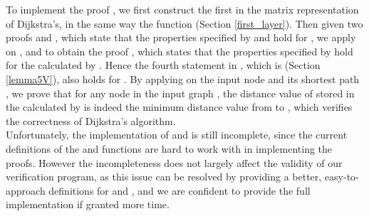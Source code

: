 To implement the proof , we first construct the first   in the matrix representation of Dijkstra's, in the same way the  function (Section \ref{first_layer}). Then given two proofs  and , which state that the properties specified by  and  hold for , we apply  on , and  to obtain the proof , which states that the properties specified by  hold for the  calculated by . Hence the fourth statement in , which is (Section \ref{lemma5V}), also holds for . By applying  on the input node  and its shortest path , we prove that for any node  in the input graph , the distance value of  stored in the  calculated by  is indeed the minimum distance value from  to , which verifies the correctness of Dijkstra's algorithm. 
\\

Unfortunately, the implementation of  and  is still incomplete, since the current definitions of the  and  functions are hard to work with in implementing the proofs. However the incompleteness does not largely affect the validity of our verification program, as this issue can be resolved by providing a better, easy-to-approach definitions for  and , and we are confident to provide the full implementation if granted more time. 
\\





